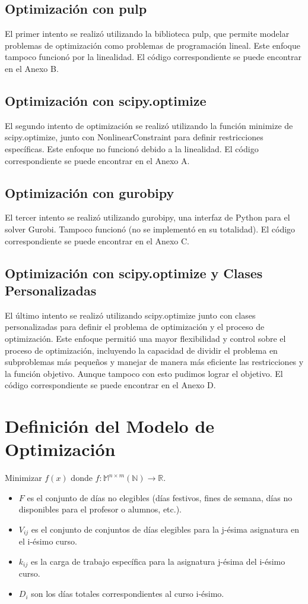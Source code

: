 \documentclass{article}
\begin{document}
\subsection{Optimización con pulp}
El primer intento se realizó utilizando la biblioteca pulp, que permite modelar problemas de optimización como problemas de programación lineal. Este enfoque tampoco funcionó por la linealidad. El código correspondiente se puede encontrar en el Anexo B.

\subsection{Optimización con scipy.optimize}
El segundo intento de optimización se realizó utilizando la función minimize de scipy.optimize, junto con NonlinearConstraint para definir restricciones específicas. Este enfoque no funcionó debido a la linealidad. El código correspondiente se puede encontrar en el Anexo A.

\subsection{Optimización con gurobipy}
El tercer intento se realizó utilizando gurobipy, una interfaz de Python para el solver Gurobi. Tampoco funcionó (no se implement\'o en su totalidad). El código correspondiente se puede encontrar en el Anexo C.

\subsection{Optimización con scipy.optimize y Clases Personalizadas}
El último intento se realizó utilizando scipy.optimize junto con clases personalizadas para definir el problema de optimización y el proceso de optimización. Este enfoque permitió una mayor flexibilidad y control sobre el proceso de optimización, incluyendo la capacidad de dividir el problema en subproblemas más pequeños y manejar de manera más eficiente las restricciones y la función objetivo. Aunque tampoco con esto pudimos lograr el objetivo. El código correspondiente se puede encontrar en el Anexo D.
\section{Definición del Modelo de Optimización}

Minimizar $f(x)$ donde $f: \mathbb{M}^{n \times m}(\mathbb{N}) \rightarrow \mathbb{R}$.

\begin{itemize}
\item $F$ es el conjunto de días no elegibles (días festivos, fines de semana, días no disponibles para el profesor o alumnos, etc.).
\item $V_{ij}$ es el conjunto de conjuntos de días elegibles para la j-ésima asignatura en el i-ésimo curso.
\item $k_{ij}$ es la carga de trabajo específica para la asignatura j-ésima del i-ésimo curso.
\item $D_i$ son los días totales correspondientes al curso i-ésimo.
\end{itemize}
\end{document}
